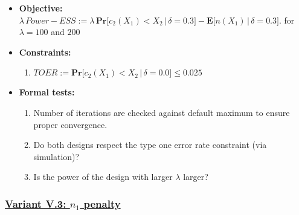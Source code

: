 \documentclass[
]{book}
\providecommand{\tightlist}{%
  \setlength{\itemsep}{0pt}\setlength{\parskip}{0pt}}
\begin{document}
\begin{itemize}
\tightlist
\item
  \textbf{Objective:} \(\lambda\, Power - ESS := \lambda\, \boldsymbol{Pr}\big[c_2(X_1) < X_2\,|\,\delta=0.3\big] - \boldsymbol{E}\big[n(X_1)\,|\,\delta=0.3\big].\)
  for \(\lambda = 100\) and \(200\)
\item
  \textbf{Constraints:}

  \begin{enumerate}
  \def\labelenumi{\arabic{enumi}.}
  \tightlist
  \item
    \(TOER := \boldsymbol{Pr}\big[c_2(X_1) < X_2\,|\,\delta=0.0\big] \leq 0.025\)
  \end{enumerate}
\item
  \textbf{Formal tests:}

  \begin{enumerate}
  \def\labelenumi{\arabic{enumi}.}
  \tightlist
  \item
    Number of iterations are checked against default maximum to ensure proper
    convergence.
  \item
    Do both designs respect the type one error rate constraint (via simulation)?
  \item
    Is the power of the design with larger \(\lambda\) larger?
  \end{enumerate}
\end{itemize}

\hypertarget{variant-v.3-n_1-penalty}{%
\subsubsection{\texorpdfstring{\protect\hyperlink{variantV_3}{Variant V.3: \(n_1\) penalty}}{Variant V.3: n\_1 penalty}}\label{variant-v.3-n_1-penalty}}
\end{document}
